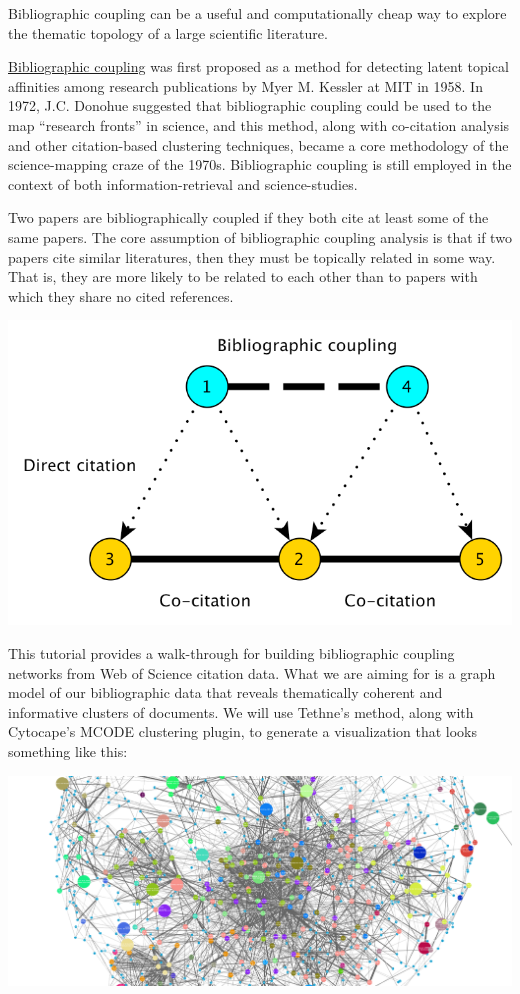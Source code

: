 \documentclass[letterpaper,10pt,english]{sphinxmanual}
\begin{document}
Bibliographic coupling can be a useful and computationally cheap way to explore the
thematic topology of a large scientific literature.

\href{http://en.wikipedia.org/wiki/Bibliographic\_coupling}{Bibliographic coupling} was first
proposed as a method for detecting latent topical affinities among research publications
by Myer M. Kessler at MIT in 1958. In 1972, J.C. Donohue suggested that bibliographic
coupling could be used to the map ``research fronts'' in science, and this method, along
with co-citation analysis and other citation-based clustering techniques, became a core
methodology of the science-mapping craze of the 1970s. Bibliographic coupling is still
employed in the context of both information-retrieval and science-studies.

Two papers are bibliographically coupled if they both cite at least some of the same
papers. The core assumption of bibliographic coupling analysis is that if two papers
cite similar literatures, then they must be topically related in some way. That is, they
are more likely to be related to each other than to papers with which they share no cited
references.

{\hfill\includegraphics{citationnetworks.png}\hfill}

This tutorial provides a walk-through for building bibliographic coupling networks from
Web of Science citation data. What we are aiming for is a graph model of our bibliographic
data that reveals thematically coherent and informative clusters of documents. We will use
Tethne's  method, along with Cytocape's MCODE clustering
plugin, to generate a visualization that looks something like this:

{\hfill\includegraphics{bibliographic_coupling.png}\hfill}
\end{document}
